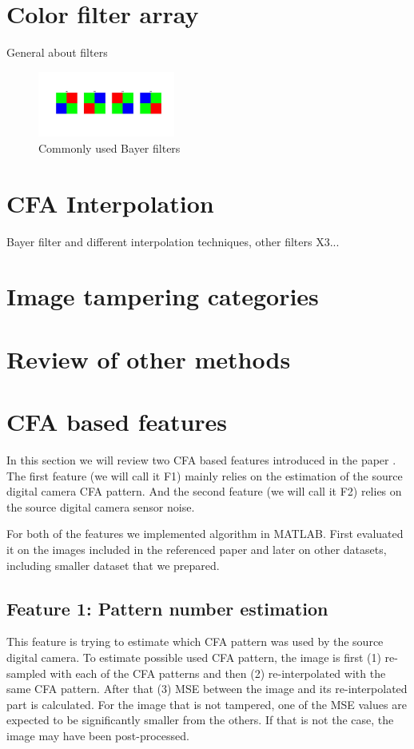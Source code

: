 \documentclass{template/acm_proc_article-sp}
\begin{document}
\section{Color filter array}
General about filters

\begin{figure}
\centering
\includegraphics[trim=175 200 100 205,clip,width=0.4\textwidth]{report/results/4_bayer_filters.jpg}
\caption{Commonly used Bayer filters}
\label{img_4_bayer_filters}
\end{figure}

\section{CFA Interpolation}
Bayer filter and different interpolation techniques, other filters X3...

\section{Image tampering categories}

\section{Review of other methods}


\section{CFA based features}
In this section we will review two CFA based features introduced in the paper \cite{dirik2009image}. The first feature (we will call it F1) mainly relies on the estimation of the source digital camera CFA pattern. And the second feature (we will call it F2) relies on the source digital camera sensor noise.

For both of the features we implemented algorithm in MATLAB. First evaluated it on the images included in the referenced paper \cite{dirik2009image} and later on other datasets, including smaller dataset that we prepared.

\subsection{Feature 1: Pattern number estimation}
This feature is trying to estimate which CFA pattern was used by the source digital camera. To estimate possible used CFA pattern, the image is first (1) re-sampled with each of the CFA patterns and then (2) re-interpolated with the same CFA pattern. After that (3) MSE between the image and its re-interpolated part is calculated. For the image that is not tampered, one of the MSE values are expected to be significantly smaller from the others. If that is not the case, the image may have been post-processed.
\end{document}
